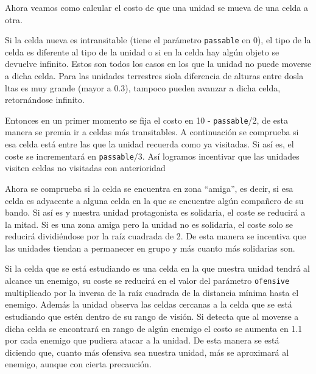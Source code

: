 Ahora veamos como calcular el costo de que una unidad se mueva de una celda a otra.
 
Si la celda nueva es intransitable (tiene el par\'ametro \verb|passable| en 0), el tipo de la celda es diferente al tipo de la unidad o si en la celda hay alg\'un objeto se devuelve infinito. Estos son todos los casos en los que la unidad no puede moverse a dicha celda. Para las unidades terrestres siola diferencia de alturas entre dosla ltas es muy grande (mayor a 0.3), tampoco pueden avanzar a dicha celda, retorn\'andose infinito. 
 
Entonces en un primer momento se fija el costo en 10 - \verb|passable|/2, de esta manera se premia ir a celdas m\'as transitables. A continuaci\'on se comprueba si esa celda est\'a entre las que la unidad recuerda como ya visitadas. Si as\'i es, el coste se incrementar\'a en \verb|passable|/3. As\'i logramos incentivar que las unidades visiten celdas no visitadas con anterioridad  
  
Ahora se comprueba si la celda se encuentra en zona ``amiga'', es decir, si esa celda es adyacente a alguna celda en la que se encuentre alg\'un compa\~{n}ero de su bando. Si as\'i es y nuestra unidad protagonista es solidaria, el coste se reducir\'a a la mitad. Si es una zona amiga pero la unidad no es solidaria, el coste solo se reducir\'a dividi\'endose por la ra\'iz cuadrada de 2. De esta manera se incentiva que las unidades tiendan a permanecer en grupo y m\'as cuanto m\'as solidarias son.

Si la celda que se est\'a estudiando es una celda en la que nuestra unidad tendr\'a al alcance un enemigo, su coste se reducir\'a en el valor del par\'ametro \verb|ofensive|  multiplicado por la inversa de la ra\'iz cuadrada de la distancia m\'inima hasta el enemigo. Adem\'as la unidad observa las celdas cercanas a la celda que se est\'a estudiando que est\'en dentro de su rango de visi\'on. Si detecta que al moverse a dicha celda se encontrar\'a en rango de alg\'un enemigo el costo se aumenta en 1.1 por cada enemigo que pudiera atacar a la unidad. De esta manera se est\'a diciendo que, cuanto m\'as ofensiva sea nuestra unidad, m\'as se aproximar\'a al enemigo, aunque con cierta precauci\'on.  